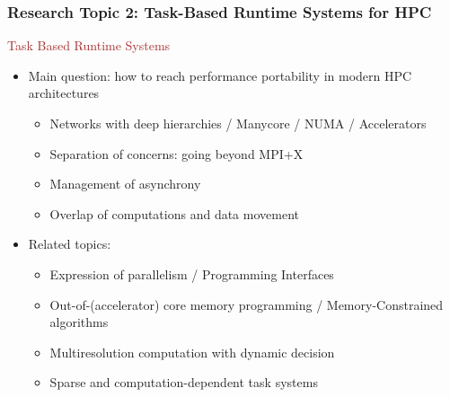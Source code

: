 \begin{frame}
  \frametitle{Research Topic 2: Task-Based Runtime Systems for HPC}

  \textcolor{brown}{Task Based Runtime Systems}
  \begin{itemize}
  \item Main question: how to reach performance portability in modern HPC architectures
    \begin{itemize}
    \item Networks with deep hierarchies / Manycore / NUMA / Accelerators
    \item Separation of concerns: going beyond MPI+X
    \item Management of asynchrony
    \item Overlap of computations and data movement
    \end{itemize}
  \item Related topics:
    \begin{itemize}
    \item Expression of parallelism / Programming Interfaces
    \item Out-of-(accelerator) core memory programming / Memory-Constrained algorithms
    \item Multiresolution computation with dynamic decision
    \item Sparse and computation-dependent task systems
    \end{itemize}
  \end{itemize}

\end{frame}


